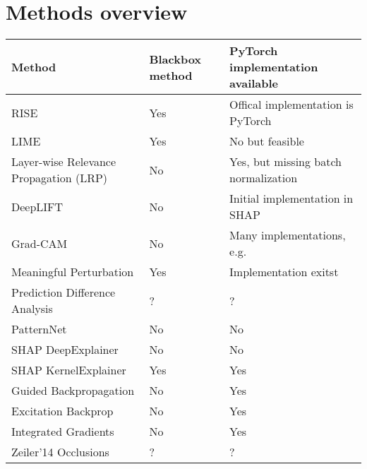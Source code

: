 \section{Methods overview}

\begin{tabular}{| p{7cm} | p{2.5cm} | p{6cm} | }
\hline
\textbf{Method} & \textbf{Blackbox method} & \textbf{PyTorch implementation available} \\ \hline

RISE\cite{Petsiuk2018rise} & Yes & Offical implementation is PyTorch \\ \hline
LIME\cite{ribeiro2016should} & Yes & No but feasible \\ \hline
Layer-wise Relevance Propagation (LRP)\cite{bach2015pixel} & No & Yes, but missing batch normalization\cite{lrppytorch} \\ \hline
DeepLIFT\cite{shrikumar2017learning} & No & Initial implementation in SHAP\cite{NIPS2017_7062} \\ \hline
Grad-CAM \cite{selvaraju2017grad} & No & Many implementations, e.g. \cite{visualattribution} \\ \hline
Meaningful Perturbation\cite{fong2017interpretable} & Yes & Implementation exitst \cite{fong2017implementation} \\ \hline
Prediction Difference Analysis \cite{todo} & ? & ? \\ \hline
PatternNet & No & No \\ \hline
SHAP DeepExplainer\cite{NIPS2017_7062} & No & No \\ \hline
SHAP KernelExplainer\cite{NIPS2017_7062} & Yes & Yes \\ \hline
Guided Backpropagation  & No & Yes \cite{visualattribution} \\ \hline
Excitation Backprop \cite{zhang2016EB} & No & Yes \cite{visualattribution} \\ \hline
Integrated Gradients\cite{sundararajan2017axiomatic} & No & Yes \cite{integratedgradientpytorch}  \\ \hline
Zeiler'14 Occlusions & ? & ? \\ \hline
\end{tabular}

